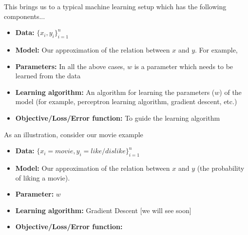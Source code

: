 \documentclass[aspectratio=169]{beamer}
\begin{document}
\begin{frame}
This brings us to a typical machine learning setup which has the following components...

\begin{itemize}
\item<2-> \textbf{Data:} $\{x_i, y_i\}_{i=1}^{n}$
\item<3-> \textbf{Model:} Our approximation of the relation between $x$ and $y$. For example, 
\item<8-> \textbf{Parameters:} In all the above cases, $w$ is a parameter which needs to be learned from the data
\item<9-> \textbf{Learning algorithm:} An algorithm for learning the parameters ($w$) of the model (for example, perceptron learning algorithm, gradient descent, etc.)
\item<10-> \textbf{Objective/Loss/Error function:} To guide the learning algorithm 
\end{itemize}
\end{frame}

\begin{frame}
As an illustration, consider our movie example

\begin{itemize}
\item<2-> \textbf{Data:} $\{x_i = movie, y_i = like/dislike\}_{i=1}^{n}$ 
\item<3-> \textbf{Model:} Our approximation of the relation between $x$ and $y$ (the probability of liking a movie). 
\vspace{-0.3in}
\item<5-> \textbf{Parameter:} $w$ 
\item<6-> \textbf{Learning algorithm:} Gradient Descent [we will see soon]
\item<7-> \textbf{Objective/Loss/Error function:} 
\end{itemize}
\end{frame}
\end{document}
